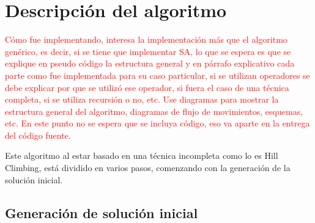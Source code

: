 \section{Descripción del algoritmo}

\textcolor{red}{Cómo fue implementando, interesa la implementación más que el algoritmo genérico, es decir, si se tiene que implementar SA, lo que se espera es que se explique en pseudo código la estructura general y en párrafo explicativo cada parte como fue implementada para su caso particular, si se utilizan operadores se debe explicar por que se utilizó ese operador, si fuera el caso de una técnica completa, si se utiliza recursión o no, etc. Use diagramas para mostrar la estructura general del algoritmo, diagramas de flujo de movimientos, esquemas, etc. En este punto no se espera que se incluya código, eso va aparte en la entrega del código fuente.}

Este algoritmo al estar basado en una técnica incompleta como lo es Hill Climbing, está dividido en varios pasos, comenzando con la generación de la solución inicial.


\subsection{Generación de solución inicial}

